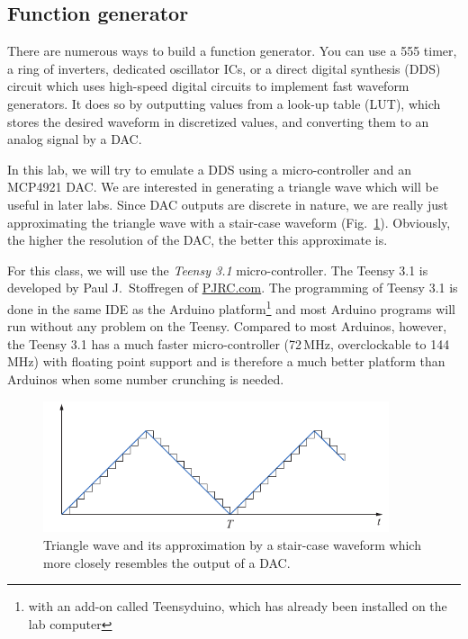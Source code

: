 \documentclass[letterpaper, 11pt]{article}
\begin{document}
\subsection{Function generator}
\label{sec:func-generator}

There are numerous ways to build a function generator. You can use a 555 timer, a ring of inverters, dedicated oscillator ICs, or a direct digital synthesis (DDS) circuit which uses high-speed digital circuits to implement fast waveform generators. It does so by outputting values from a look-up table (LUT), which stores the desired waveform in discretized values, and converting them to an analog signal by a DAC. 

In this lab, we will try to emulate a DDS using a micro-controller and an MCP4921 DAC. We are interested in generating a triangle wave which will be useful in later labs. Since DAC outputs are discrete in nature, we are really just approximating the triangle wave with a stair-case waveform (Fig.~\ref{fig:triangle-wave}). Obviously, the higher the resolution of the DAC, the better this approximate is. 

For this class, we will use the \textit{Teensy 3.1} micro-controller. The Teensy 3.1 is developed by Paul J.~Stoffregen of \href{https://www.pjrc.com}{PJRC.com}. The programming of Teensy 3.1 is done in the same IDE as the Arduino platform\footnote{with an add-on called Teensyduino, which has already been installed on the lab computer} and most Arduino programs will run without any problem on the Teensy. Compared to most Arduinos, however, the Teensy 3.1 has a much faster micro-controller (72\,MHz, overclockable to 144\,MHz) with floating point support and is therefore a much better platform than Arduinos when some number crunching is needed. 

	\begin{figure}[h]
		\centering
		\includegraphics[width=4in]{triangle-wave}
		\caption{Triangle wave and its approximation by a stair-case waveform which more closely resembles the output of a DAC.}
		\label{fig:triangle-wave}
	\end{figure}
\end{document}
